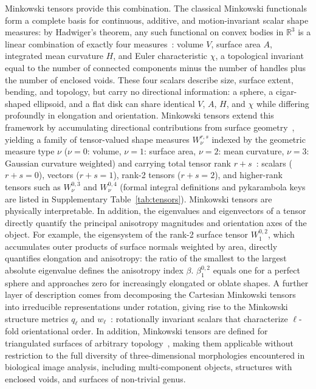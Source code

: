 \documentclass[times, twoside, watermark]{zHenriquesLab-StyleBioRxiv}
\newcommand{\newtxt}[1]{#1}
\newcommand{\added}[2][]{#2}        %
\newcommand{\newtxt}[1]{\textcolor{chgadded}{#1}}
\renewcommand{\added}[2][]{\newtxt{#2}}  %
\begin{document}
Minkowski tensors provide this combination.
The classical Minkowski functionals form a complete basis for continuous, additive, and motion-invariant scalar shape measures: by Hadwiger's theorem, any such functional on convex bodies in $\mathbb{R}^3$ is a linear combination of exactly four measures~\cite{Hadwiger1957}: volume $V$, surface area $A$, integrated mean curvature $H$, and Euler characteristic $\chi$, a topological invariant equal to the number of connected components minus the number of handles plus the number of enclosed voids.
These four scalars describe size, surface extent, bending, and topology, but carry no directional information: a sphere, a cigar-shaped ellipsoid, and a flat disk can share identical $V$, $A$, $H$, and $\chi$ while differing profoundly in elongation and orientation.
Minkowski tensors extend this framework by accumulating directional contributions from surface geometry~\cite{SchroderTurk2013}, yielding a family of tensor-valued shape measures $W_\nu^{r,s}$ indexed by the geometric measure type $\nu$ ($\nu=0$: volume, $\nu=1$: surface area, $\nu=2$: mean curvature, $\nu=3$: Gaussian curvature weighted) and carrying total tensor rank $r+s$~\cite{SchroderTurk2013}: scalars ($r+s=0$), vectors ($r+s=1$), rank-2 tensors ($r+s=2$), and higher-rank tensors such as $W_\nu^{0,3}$ and $W_\nu^{0,4}$ \added{(formal integral definitions and pykarambola keys are listed in Supplementary Table~\ref{tab:tensors})}.
Minkowski tensors are physically interpretable. In addition, the eigenvalues and eigenvectors of a tensor directly quantify the principal anisotropy magnitudes and orientation axes of the object.
For example, the eigensystem of the rank-2 surface tensor $W_1^{0,2}$, which accumulates outer products of surface normals weighted by area, directly quantifies elongation and anisotropy: the ratio of the smallest to the largest absolute eigenvalue defines the anisotropy index $\beta$.
$\beta_1^{0,2}$ equals one for a perfect sphere and approaches zero for increasingly elongated or oblate shapes.
A further layer of description comes from decomposing the Cartesian Minkowski tensors into irreducible representations under rotation, giving rise to the Minkowski structure metrics $q_\ell$ and $w_\ell$~\cite{Steinhardt1983, Mickel2013}: rotationally invariant scalars that characterize $\ell$-fold orientational order.
In addition, Minkowski tensors are defined for triangulated surfaces of arbitrary topology~\cite{SchroderTurk2013}, making them applicable without restriction to the full diversity of three-dimensional morphologies encountered in biological image analysis, including multi-component objects, structures with enclosed voids, and surfaces of non-trivial genus.
\end{document}

